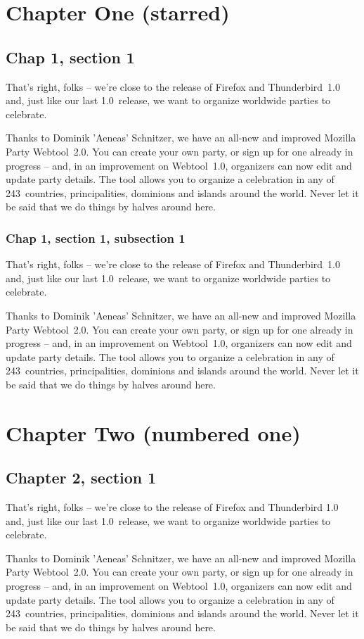 \documentclass[12pt,a4paper]{report}
\begin{document}
\dominitoc
\tableofcontents
\chapter*{Chapter One (starred)}
\minitoc
\section{Chap 1, section 1}
That's right, folks -- we're close to the release of Firefox and
Thunderbird~1.0 and, just like our last 1.0~release, we want to organize
worldwide parties to celebrate.

Thanks to Dominik 'Aeneas' Schnitzer, we have an all-new and improved
Mozilla Party Webtool~2.0. You can create your own party, or sign up for
one already in progress -- and, in an improvement on Webtool~1.0,
organizers can now edit and update party details. The tool allows you to
organize a celebration in any of 243~countries, principalities,
dominions and islands around the world. Never let it be said that we do
things by halves around here.

\subsection{Chap 1, section 1, subsection 1}
That's right, folks -- we're close to the release of Firefox and
Thunderbird~1.0 and, just like our last 1.0~release, we want to organize
worldwide parties to celebrate.

Thanks to Dominik 'Aeneas' Schnitzer, we have an all-new and improved
Mozilla Party Webtool~2.0. You can create your own party, or sign up for
one already in progress -- and, in an improvement on Webtool~1.0,
organizers can now edit and update party details. The tool allows you to
organize a celebration in any of 243~countries, principalities,
dominions and islands around the world. Never let it be said that we do
things by halves around here.
\chapter{Chapter Two (numbered one)}
\minitoc
\section{Chapter 2, section 1}
That's right, folks -- we're close to the release of Firefox and
Thunderbird 1.0 and, just like our last 1.0~release, we want to organize
worldwide parties to celebrate.

Thanks to Dominik 'Aeneas' Schnitzer, we have an all-new and improved
Mozilla Party Webtool~2.0. You can create your own party, or sign up for
one already in progress -- and, in an improvement on Webtool~1.0,
organizers can now edit and update party details. The tool allows you to
organize a celebration in any of 243~countries, principalities,
dominions and islands around the world. Never let it be said that we do
things by halves around here.
\end{document}
